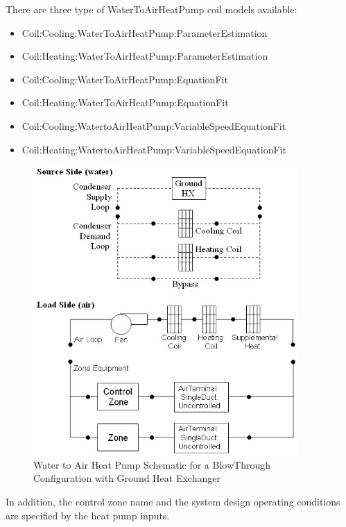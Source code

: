 There are three type of WaterToAirHeatPump coil models available:

\begin{itemize}
\item
  Coil:Cooling:WaterToAirHeatPump:ParameterEstimation
\item
  Coil:Heating:WaterToAirHeatPump:ParameterEstimation
\item
  Coil:Cooling:WaterToAirHeatPump:EquationFit
\item
  Coil:Heating:WaterToAirHeatPump:EquationFit
\item
  Coil:Cooling:WatertoAirHeatPump:VariableSpeedEquationFit
\item
  Coil:Heating:WatertoAirHeatPump:VariableSpeedEquationFit
\end{itemize}

\begin{figure}[hbtp] %
\centering
\includegraphics[width=0.9\textwidth, height=0.9\textheight, keepaspectratio=true]{media/image304.png}
\caption{Water to Air Heat Pump Schematic for a BlowThrough Configuration with Ground Heat Exchanger \protect \label{fig:water-to-air-heat-pump-schematic-for-a}}
\end{figure}

In addition, the control zone name and the system design operating conditions are specified by the heat pump inputs.

